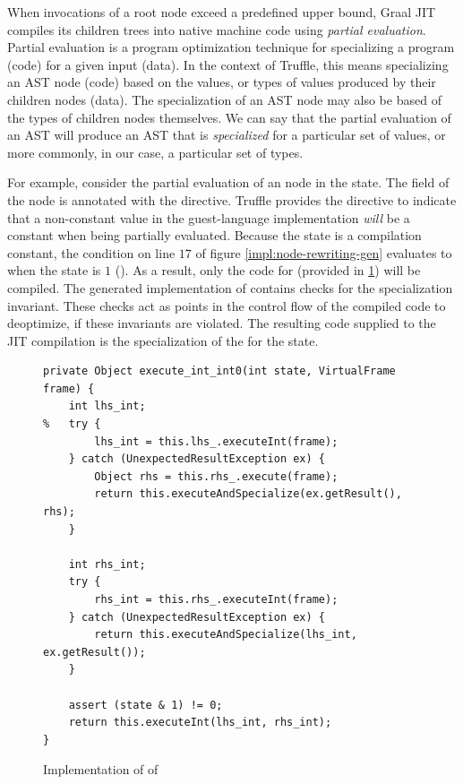 When invocations of a root node exceed a predefined upper bound, Graal JIT compiles its children trees into native machine code using \textit{partial evaluation}.
Partial evaluation is a program optimization technique for specializing a program (code) for a given input (data)\cite{futamura:partial-eval}.
In the context of Truffle, this means specializing an AST node (code) based on the values, or types of values produced by their children nodes (data)\cite{truffle:partial-eval}.
The specialization of an AST node may also be based of the types of children nodes themselves.
We can say that the partial evaluation of an AST  will produce an AST that is \textit{specialized} for a particular set of values, or more commonly, in our case, a particular set of types.

For example, consider the partial evaluation of an  node in the  state.
The  field of the node is annotated with the  directive.
Truffle provides the  directive to indicate that a non-constant value in the guest-language implementation \textit{will} be a constant when being partially evaluated.
Because the state is a compilation constant, the condition on line $17$ of figure \ref{impl:node-rewriting-gen} evaluates to  when the state is $1$ ().
As a result, only the code for  (provided in \ref{impl:node-rewriting-state2}) will be compiled.
The generated implementation of  contains checks for the specialization invariant.
These checks act as points in the control flow of the compiled code to deoptimize, if these invariants are violated.
The resulting code supplied to the JIT compilation is the specialization of the  for the  state.

\begin{figure}[!htb]
\begin{verbatim}
private Object execute_int_int0(int state, VirtualFrame frame) {
	int lhs_int;
%	try {
		lhs_int = this.lhs_.executeInt(frame);
	} catch (UnexpectedResultException ex) {
		Object rhs = this.rhs_.execute(frame);
		return this.executeAndSpecialize(ex.getResult(), rhs);
	}
	
	int rhs_int;
	try {
		rhs_int = this.rhs_.executeInt(frame);
	} catch (UnexpectedResultException ex) {
		return this.executeAndSpecialize(lhs_int, ex.getResult());
	}
	
	assert (state & 1) != 0;
	return this.executeInt(lhs_int, rhs_int);
}
\end{verbatim}
\caption{Implementation of  of }
\label{impl:node-rewriting-state2}
\end{figure}


